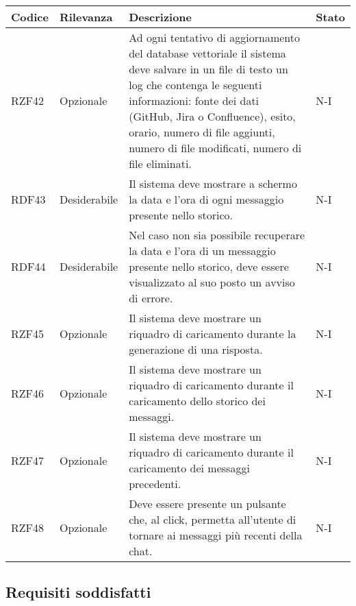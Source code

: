 \vspace{0.5cm}
\newpage
\begin{table}[h!]
    \renewcommand{\arraystretch}{1.6} %
    \begin{tabularx}{\textwidth}{|p{2cm}|p{3cm}|X|p{4cm}|} \hline
    \rowcolor[HTML]{FFD700} 
    \textbf{Codice} & \textbf{Rilevanza} & \textbf{Descrizione} & \textbf{Stato} \\ \hline

    RZF42 & Opzionale & Ad ogni tentativo di aggiornamento del database vettoriale il sistema deve salvare in un file di testo un log che contenga le seguenti informazioni: 
    fonte dei dati (GitHub, Jira o Confluence), esito, orario, numero di file aggiunti, numero di file modificati, numero di file eliminati. & N-I \\ \hline
    RDF43 & Desiderabile & Il sistema deve mostrare a schermo la data e l'ora di ogni messaggio presente nello storico. & N-I \\ \hline
    RDF44 & Desiderabile & Nel caso non sia possibile recuperare la data e l'ora di un messaggio presente nello storico, deve essere visualizzato al suo posto un avviso di errore. & N-I \\ \hline
    RZF45 & Opzionale & Il sistema deve mostrare un riquadro di caricamento durante la generazione di una risposta. & N-I \\ \hline
    RZF46 & Opzionale & Il sistema deve mostrare un riquadro di caricamento durante il caricamento dello storico dei messaggi. & N-I \\ \hline
    RZF47 & Opzionale & Il sistema deve mostrare un riquadro di caricamento durante il caricamento dei messaggi precedenti. & N-I \\ \hline
    RZF48 & Opzionale & Deve essere presente un pulsante che, al click, permetta all'utente di tornare ai messaggi più recenti della chat. & N-I \\ \hline
    \end{tabularx}
\end{table}


\subsection{Requisiti soddisfatti}
\label{sec:requisiti_soddisfatti}
